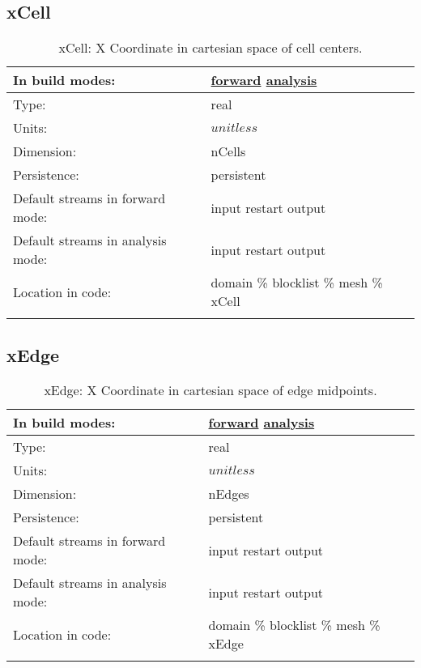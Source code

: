 \subsection[xCell]{xCell}
\label{subsec:var_sec_mesh_xCell}
\begin{center}
\begin{longtable}{| p{2.0in} | p{4.0in} |}
        \hline 
        In build modes: & \hyperref[subsec:forward_var_tab_mesh]{forward} \hyperref[subsec:analysis_var_tab_mesh]{analysis} \\
        \hline 
        Type: & real \\
        \hline 
        Units: & $unitless$ \\
        \hline 
        Dimension: & nCells \\
        \hline 
        Persistence: & persistent \\
        \hline 
		 Default streams in forward mode: &  input restart output \\
        \hline 
		 Default streams in analysis mode: &  input restart output \\
        \hline 
		 Location in code: & domain \% blocklist \% mesh \% xCell \\
		 \hline 
    \caption{xCell: X Coordinate in cartesian space of cell centers.}
\end{longtable}
\end{center}
\subsection[xEdge]{xEdge}
\label{subsec:var_sec_mesh_xEdge}
\begin{center}
\begin{longtable}{| p{2.0in} | p{4.0in} |}
        \hline 
        In build modes: & \hyperref[subsec:forward_var_tab_mesh]{forward} \hyperref[subsec:analysis_var_tab_mesh]{analysis} \\
        \hline 
        Type: & real \\
        \hline 
        Units: & $unitless$ \\
        \hline 
        Dimension: & nEdges \\
        \hline 
        Persistence: & persistent \\
        \hline 
		 Default streams in forward mode: &  input restart output \\
        \hline 
		 Default streams in analysis mode: &  input restart output \\
        \hline 
		 Location in code: & domain \% blocklist \% mesh \% xEdge \\
		 \hline 
    \caption{xEdge: X Coordinate in cartesian space of edge midpoints.}
\end{longtable}
\end{center}

